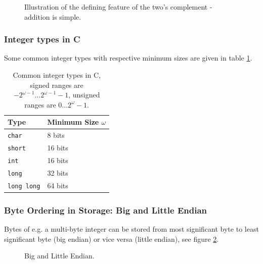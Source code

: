 \begin{figure}[!htb]
 \centering
 \hfill
 \caption{Illustration of the defining feature of the two's complement - addition is simple.}
 \label{fig:tcompl}
\end{figure}


\subsubsection{Integer types in C}

Some common integer types with respective minimum sizes are given in table \ref{tab:inttypes}.

\begin{table}[!htb]
    \centering
    \begin{tabular}{l|l}
        Type & Minimum Size $\omega$ \\
        \hline
        \texttt{char} & 8 bits \\
        \texttt{short} & 16 bits\\
        \texttt{int} & 16 bits\\
        \texttt{long} & 32 bits\\
        \texttt{long long} & 64 bits\\
    \end{tabular}
    \caption{Common integer types in C, signed ranges are $-2^{\omega-1} \dots 2^{\omega-1} - 1$, unsigned ranges are $0 \dots 2^\omega - 1$.}
    \label{tab:inttypes}
\end{table}


\subsubsection{Byte Ordering in Storage: Big and Little Endian}
Bytes of e.g. a multi-byte integer can be stored from most significant byte to least significant byte (big endian) or vice versa (little endian), see figure \ref{fig:endian}.

\begin{figure}[!htb]
 \centering
 \hfill
 \caption{Big and Little Endian.}
 \label{fig:endian}
\end{figure}

